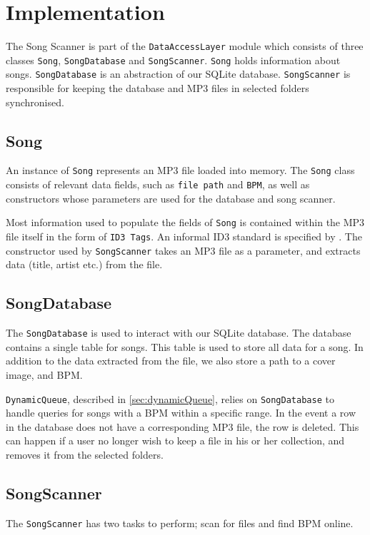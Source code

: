 \section{Implementation}
The Song Scanner is part of the \texttt{DataAccessLayer} module which consists of three classes \texttt{Song}, \texttt{SongDatabase} and \texttt{SongScanner}. \texttt{Song} holds information about songs. \texttt{SongDatabase} is an abstraction of our SQLite database. \texttt{SongScanner} is responsible for keeping the database and MP3 files in selected folders synchronised.

\subsection{Song}
An instance of \texttt{Song} represents an MP3 file loaded into memory. The \texttt{Song} class consists of relevant data fields, such as \texttt{file path} and \texttt{BPM}, as well as constructors whose parameters are used for the database and song scanner. 

Most information used to populate the fields of \texttt{Song} is contained within the MP3 file itself in the form of \texttt{ID3 Tags}. An informal ID3 standard is specified by \citet{ID3:standard}. The constructor used by \texttt{SongScanner} takes an MP3 file as a parameter, and extracts data (title, artist etc.) from the file.

\subsection{SongDatabase}
The \texttt{SongDatabase} is used to interact with our SQLite database. The database contains a single table for songs. This table is used to store all data for a song. In addition to the data extracted from the file, we also store a path to a cover image, and BPM.

\texttt{DynamicQueue}, described in \cref{sec:dynamicQueue}, relies on \texttt{SongDatabase} to handle queries for songs with a BPM within a specific range. In the event a row in the database does not have a corresponding MP3 file, the row is deleted. This can happen if a user no longer wish to keep a file in his or her collection, and removes it from the selected folders. 

\subsection{SongScanner} 
The \texttt{SongScanner} has two tasks to perform; scan for files and find BPM online.

